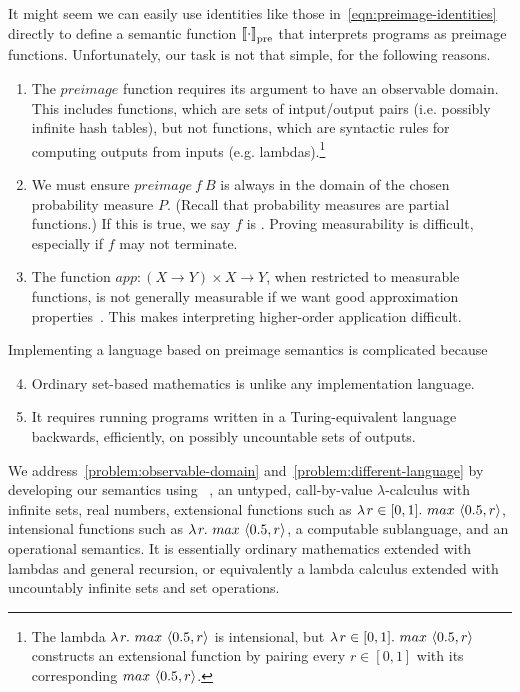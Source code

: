 \documentclass{llncs}
\newcommand{\pre}{_\mathrm{pre}}
\begin{document}
It might seem we can easily use identities like those in~\eqref{eqn:preimage-identities} directly to define a semantic function $\meaningof{\cdot}\pre$ that interprets programs as preimage functions.
Unfortunately, our task is not that simple, for the following reasons.
\begin{enumerate}
	\item The $preimage$ function requires its argument to have an observable domain. This includes  functions, which are sets of intput/output pairs (i.e. possibly infinite hash tables), but not  functions, which are syntactic rules for computing outputs from inputs (e.g. lambdas).\footnote{The lambda $\lambda\mspace{2mu}{r}\ldotp\, max~\langle{0.5,r}\rangle$ is intensional, but $\lambda\mspace{2mu}{r \in [0,1]}\ldotp\, max~\langle{0.5,r}\rangle$ constructs an extensional function by pairing every $r \in [0,1]$ with its corresponding $max~\langle{0.5,r}\rangle$.}
\label{problem:observable-domain}
	\item We must ensure $preimage~f~B$ is always in the domain of the chosen probability measure $P$. (Recall that probability measures are partial functions.) If this is true, we say $f$ is . Proving measurability is difficult, especially if $f$ may not terminate.%
\label{problem:measurability}
	\item The function $app : (X \to Y) \times X \to Y$, when restricted to measurable functions, is not generally measurable if we want good approximation properties~\cite{cit:aumann-1961ijm-borel}. This makes interpreting higher-order application difficult.%
\label{problem:higher-orderness}
\end{enumerate}
Implementing a language based on preimage semantics is complicated because
\begin{enumerate}
	\setcounter{enumi}{3}
	\item Ordinary set-based mathematics is unlike any implementation language.%
\label{problem:different-language}
	\item It requires running programs written in a Turing-equivalent language backwards, efficiently, on possibly uncountable sets of outputs.%
\label{problem:backward-efficient}
\end{enumerate}

We address~\ref{problem:observable-domain} and~\ref{problem:different-language} by developing our semantics using \lzfclang~\cite{cit:toronto-2012flops-lzfc}, an untyped, call-by-value $\lambda$-calculus with infinite sets, real numbers, extensional functions such as $\lambda\mspace{2mu}{r \in [0,1]}\ldotp\, max~\langle{0.5,r}\rangle$, intensional functions such as $\lambda\mspace{2mu}{r}\ldotp\, max~\langle{0.5,r}\rangle$, a computable sublanguage, and an operational semantics.
It is essentially ordinary mathematics extended with lambdas and general recursion, or equivalently a lambda calculus extended with uncountably infinite sets and set operations.
\end{document}

